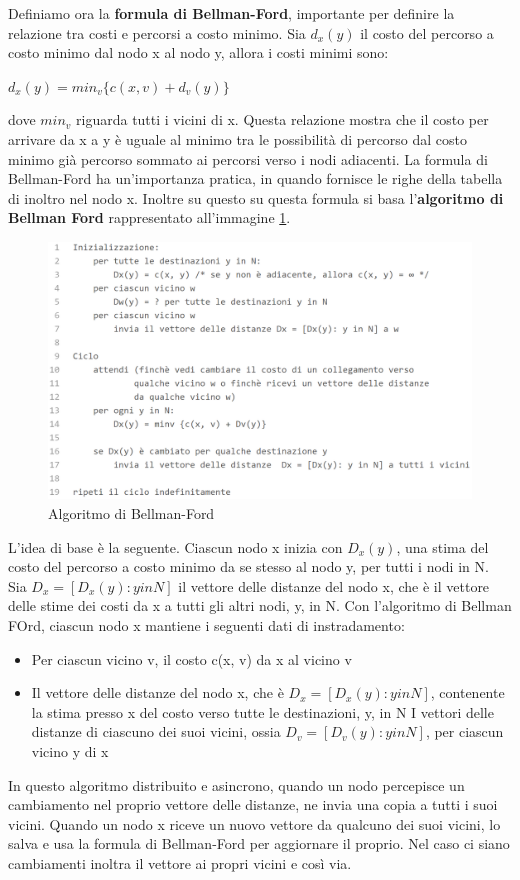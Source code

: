\documentclass[11pt,a4paper]{article}
\begin{document}
Definiamo ora la \textbf{formula di Bellman-Ford}, importante per definire la relazione tra costi e percorsi a costo minimo. Sia $d_{x}(y)$ il costo del percorso a costo minimo dal nodo x al nodo y, allora i costi minimi sono:
\begin{center}
	$d_{x}(y) = min_{v}\{c(x, v) + d_{v}(y)\}$
\end{center}
dove $min_{v}$ riguarda tutti i vicini di x. Questa relazione mostra che il costo per arrivare da x a y è uguale al minimo tra le possibilità di percorso dal costo minimo già percorso sommato ai percorsi verso i nodi adiacenti.
La formula di Bellman-Ford ha un'importanza pratica, in quando fornisce le righe della tabella di inoltro nel nodo x. Inoltre su questo su questa formula si basa l'\textbf{algoritmo di Bellman Ford} rappresentato all'immagine \ref{fig: 067}.
\begin{figure}
	\includegraphics[scale=0.4]{img/067.png}
	\caption{Algoritmo di Bellman-Ford}
	\label{fig: 067}
\end{figure}
L'idea di base è la seguente. Ciascun nodo x inizia con $D_{x}(y)$, una stima del costo del percorso a costo minimo da se stesso al nodo y, per tutti i nodi in N. Sia $D_{x} = [D_{x}(y): y in N]$ il vettore delle distanze del nodo x, che è il vettore delle stime dei costi da x a tutti gli altri nodi, y, in N. Con l'algoritmo di Bellman FOrd, ciascun nodo x mantiene i seguenti dati di instradamento:
\begin{itemize}
	\item Per ciascun vicino v, il costo c(x, v) da x al vicino v
	\item Il vettore delle distanze del nodo x, che è $D_{x} = [D_{x}(y): y in N]$, contenente la stima presso x del costo verso tutte le destinazioni, y, in N
	I vettori delle distanze di ciascuno dei suoi vicini, ossia $D_{v} = [D_{v}(y): y in N]$, per ciascun vicino y di x
\end{itemize}
In questo algoritmo distribuito e asincrono, quando un nodo percepisce un cambiamento nel proprio vettore delle distanze, ne invia una copia a tutti i suoi vicini. Quando un nodo x riceve un nuovo vettore da qualcuno dei suoi vicini, lo salva e usa la formula di Bellman-Ford per aggiornare il proprio. Nel caso ci siano cambiamenti inoltra il vettore ai propri vicini e così via.
\end{document}
